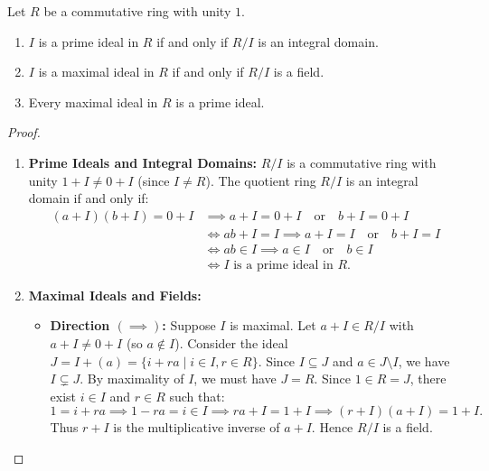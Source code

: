 \begin{theorem}
\label{thm:prime_maximal_char}
Let $R$ be a commutative ring with unity $1$.
\begin{enumerate}[label=\textbf{(\roman*)}, leftmargin=*, itemsep=4pt]
    \item $I$ is a prime ideal in $R$ if and only if $R/I$ is an integral domain.
    \item $I$ is a maximal ideal in $R$ if and only if $R/I$ is a field.
    \item Every maximal ideal in $R$ is a prime ideal.
\end{enumerate}
\end{theorem}

\begin{proof}
\begin{enumerate}[label=\textbf{(\roman*)}, leftmargin=*, itemsep=8pt]
    \item \textbf{Prime Ideals and Integral Domains:}
    $R/I$ is a commutative ring with unity $1 + I \ne 0 + I$ (since $I \ne R$).
    The quotient ring $R/I$ is an integral domain if and only if:
    \begin{align*}
    (a+I)(b+I) = 0+I &\implies a+I = 0+I \quad\text{or}\quad b+I = 0+I \\
    &\iff ab + I = I \implies a+I = I \quad\text{or}\quad b+I = I \\
    &\iff ab \in I \implies a \in I \quad\text{or}\quad b \in I \\
    &\iff I \text{ is a prime ideal in } R.
    \end{align*}

    \item \textbf{Maximal Ideals and Fields:}
    \begin{itemize}[leftmargin=1.5em, itemsep=4pt]
        \item \textbf{Direction $(\implies)$:} Suppose $I$ is maximal. Let $a + I \in R/I$ with $a + I \ne 0 + I$ (so $a \notin I$).
        Consider the ideal $J = I + (a) = \{ i + ra \mid i \in I, r \in R \}$.
        Since $I \subseteq J$ and $a \in J \setminus I$, we have $I \subsetneq J$.
        By maximality of $I$, we must have $J = R$.
        Since $1 \in R = J$, there exist $i \in I$ and $r \in R$ such that:
        \begin{equation*}
        1 = i + ra \implies 1 - ra = i \in I \implies ra + I = 1 + I \implies (r+I)(a+I) = 1+I.
        \end{equation*}
        Thus $r + I$ is the multiplicative inverse of $a + I$. Hence $R/I$ is a field.
        

\end{itemize}
\end{enumerate}
\end{proof}

